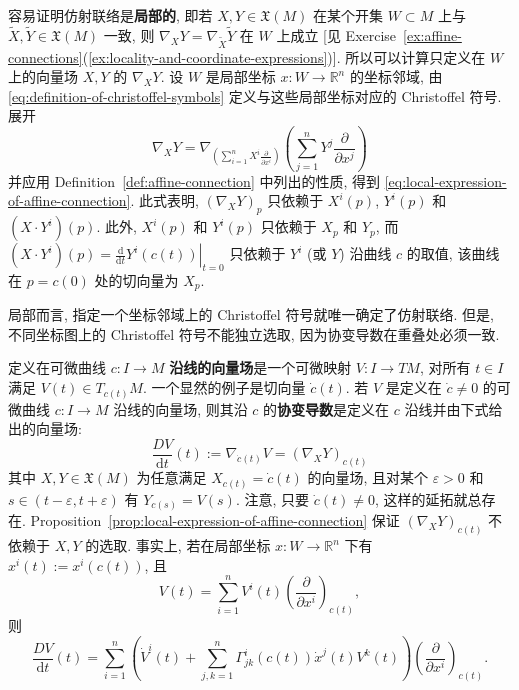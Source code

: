 \begin{RiemannProof}
容易证明仿射联络是\textbf{局部的}, 即若 $X,Y\in\mathfrak{X}(M)$ 在某个开集 $W\subset M$ 上与 $\widetilde X,\widetilde Y\in\mathfrak{X}(M)$ 一致, 则 $\nabla_XY=\nabla_{\widetilde X}\widetilde Y$ 在 $W$ 上成立 [见 Exercise~\ref{ex:affine-connections}(\ref{ex:locality-and-coordinate-expressions})]. 所以可以计算只定义在 $W$ 上的向量场 $X,Y$ 的 $\nabla_XY$. 设 $W$ 是局部坐标 $x:W\to\mathbb{R}^n$ 的坐标邻域, 由 \eqref{eq:definition-of-christoffel-symbols} 定义与这些局部坐标对应的 Christoffel 符号. 展开
\[
  \nabla_XY=\nabla_{\left(\sum_{i=1}^nX^i\frac{\partial}{\partial x^i}\right)}
  \left(\sum_{j=1}^nY^j\frac{\partial}{\partial x^j}\right)
\]
并应用 Definition~\ref{def:affine-connection} 中列出的性质, 得到 \eqref{eq:local-expression-of-affine-connection}. 此式表明, $(\nabla_XY)_p$ 只依赖于 $X^i(p)$, $Y^i(p)$ 和 $(X\cdot Y^i)(p)$. 此外, $X^i(p)$ 和 $Y^i(p)$ 只依赖于 $X_p$ 和 $Y_p$, 而 $(X\cdot Y^i)(p)=\left.\frac{\mathrm{d}}{\mathrm{d}t}Y^i(c(t))\right|_{t=0}$ 只依赖于 $Y^i$ (或 $Y$) 沿曲线 $c$ 的取值, 该曲线在 $p=c(0)$ 处的切向量为 $X_p$.
\end{RiemannProof}

\begin{RiemannRemark}\label{rem:connection-determined-by-christoffel-symbols}
局部而言, 指定一个坐标邻域上的 Christoffel 符号就唯一确定了仿射联络. 但是, 不同坐标图上的 Christoffel 符号不能独立选取, 因为协变导数在重叠处必须一致.
\end{RiemannRemark}

定义在可微曲线 $c:I\to M$ \textbf{沿线的向量场}是一个可微映射 $V:I\to TM$, 对所有 $t\in I$ 满足 $V(t)\in T_{c(t)}M$. 一个显然的例子是切向量 $\dot c(t)$. 若 $V$ 是定义在 $\dot c\ne0$ 的可微曲线 $c:I\to M$ 沿线的向量场, 则其沿 $c$ 的\textbf{协变导数}是定义在 $c$ 沿线并由下式给出的向量场:
\[
  \frac{DV}{\mathrm{d}t}(t):=\nabla_{\dot c(t)}V=(\nabla_XY)_{c(t)}
\]
其中 $X,Y\in\mathfrak{X}(M)$ 为任意满足 $X_{c(t)}=\dot c(t)$ 的向量场, 且对某个 $\varepsilon>0$ 和 $s\in(t-\varepsilon,t+\varepsilon)$ 有 $Y_{c(s)}=V(s)$. 注意, 只要 $\dot c(t)\ne0$, 这样的延拓就总存在. Proposition~\ref{prop:local-expression-of-affine-connection} 保证 $(\nabla_XY)_{c(t)}$ 不依赖于 $X,Y$ 的选取. 事实上, 若在局部坐标 $x:W\to\mathbb{R}^n$ 下有 $x^i(t):=x^i(c(t))$, 且
\[
  V(t)=\sum_{i=1}^n V^i(t)\left(\frac{\partial}{\partial x^i}\right)_{c(t)},
\]
则
\[
  \frac{DV}{\mathrm{d}t}(t)=\sum_{i=1}^n
  \left(\dot V^i(t)+\sum_{j,k=1}^n\Gamma_{jk}^i(c(t))\dot x^j(t)V^k(t)\right)
  \left(\frac{\partial}{\partial x^i}\right)_{c(t)}.
\]

